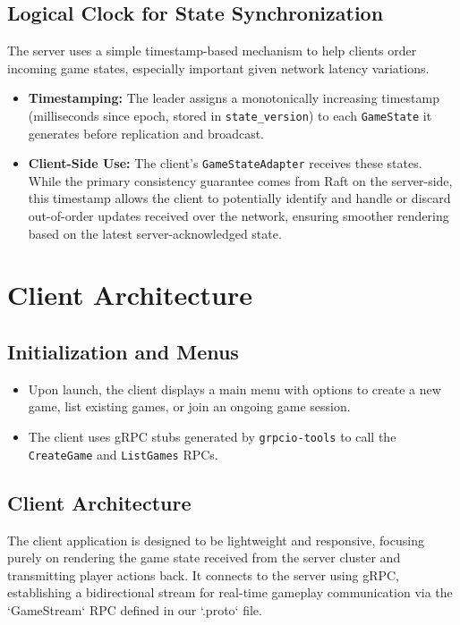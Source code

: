 \documentclass[11pt]{article}
\begin{document}
\subsection{Logical Clock for State Synchronization}
The server uses a simple timestamp-based mechanism to help clients order incoming game states, especially important given network latency variations.
\begin{itemize}
    \item \textbf{Timestamping:} The leader assigns a monotonically increasing timestamp (milliseconds since epoch, stored in \texttt{state\_version}) to each \texttt{GameState} it generates before replication and broadcast.
    \item \textbf{Client-Side Use:} The client's \texttt{GameStateAdapter} receives these states. While the primary consistency guarantee comes from Raft on the server-side, this timestamp allows the client to potentially identify and handle or discard out-of-order updates received over the network, ensuring smoother rendering based on the latest server-acknowledged state.
\end{itemize}

\section{Client Architecture}
\subsection{Initialization and Menus}
\begin{itemize}
  \item Upon launch, the client displays a main menu with options to create a new game, list existing games, or join an ongoing game session.
  \item The client uses gRPC stubs generated by \texttt{grpcio-tools} to call the \texttt{CreateGame} and \texttt{ListGames} RPCs.
\end{itemize}

\subsection{Client Architecture}
The client application is designed to be lightweight and responsive, focusing purely on rendering the game state received from the server cluster and transmitting player actions back. It connects to the server using gRPC, establishing a bidirectional stream for real-time gameplay communication via the `GameStream` RPC defined in our `.proto` file.
\end{document}
